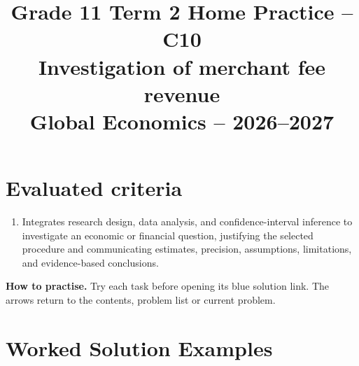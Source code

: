 \makeatletter
{}
\makeatother


\usepackage{needspace}
\usepackage{titling}
\setlength{\droptitle}{-2em}
\pretitle{\par\begingroup\centering\LARGE}
\posttitle{\par\endgroup}
\preauthor{}\postauthor{}
\predate{}\postdate{}
\maketitlehookd{\vspace{-1em}}
\linespread{1.12}
\setlength{\parskip}{5pt}

\title{Grade 11 Term 2 Home Practice -- C10\\\large Investigation of merchant fee revenue\\[0.25em]
	\normalsize Global Economics -- 2026--2027}
\author{}
\date{}


	\maketitle

	\setcounter{tocdepth}{1}
	\setcounter{secnumdepth}{2}
	\label{toc}
	\tableofcontents

	\section*{Evaluated criteria}
	\begin{enumerate}[label=\textbf{C\arabic*},start=10]
		\item Integrates research design, data analysis, and confidence-interval inference to investigate an economic or financial question, justifying the selected procedure and communicating estimates, precision, assumptions, limitations, and evidence-based conclusions.
	\end{enumerate}

	\textbf{How to practise.} Try each task before opening its blue solution link. The arrows return to the contents, problem list or current problem.

	\section{Worked Solution Examples}
	\label{sec:worked-solution-examples}



